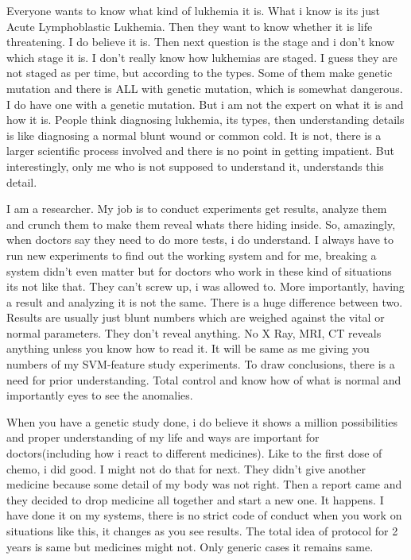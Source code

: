 Everyone wants to know what kind of lukhemia it is. What i know is its just Acute Lymphoblastic Lukhemia. Then they want to know whether it is life threatening. I do believe it is. Then next question is the stage and i don't know which stage it is. I don't really know how lukhemias are staged. I guess they are not staged as per time, but according to the types. Some of them make genetic mutation and there is ALL with genetic mutation, which is somewhat dangerous. I do have one with a genetic mutation. But i am not the expert on what it is and how it is. People think diagnosing lukhemia, its types, then understanding details is like diagnosing a normal blunt wound or common cold. It is not, there is a larger scientific process involved and there is no point in getting impatient. But interestingly, only me who is not supposed to understand it, understands this detail.

I am a researcher. My job is to conduct experiments get results, analyze them and crunch them to make them reveal whats there hiding inside. So, amazingly, when doctors say they need to do more tests, i do understand. I always have to run new experiments to find out the working system and for me, breaking a system didn't even matter but for doctors who work in these kind of situations its not like that. They can't screw up, i was allowed to. More importantly, having a result and analyzing it is not the same. There is a huge difference between two. Results are usually just blunt numbers which are weighed against the vital or normal parameters. They don't reveal anything. No X Ray, MRI, CT reveals anything unless you know how to read it. It will be same as me giving you numbers of my SVM-feature study experiments. To draw conclusions, there is a need for prior understanding. Total control and know how of what is normal and importantly eyes to see the anomalies. 

When you have a genetic study done, i do believe it shows a million possibilities and proper understanding of my life and ways are important for doctors(including how i react to different medicines). Like to the first dose of chemo, i did good. I might not do that for next. They didn't give another medicine because some detail of my body was not right. Then a report came and they decided to drop medicine all together and start a new one. It happens. I have done it on my systems, there is no strict code of conduct when you work on situations like this, it changes as you see results. The total idea of protocol for 2 years is same but medicines might not. Only generic cases it remains same. 

